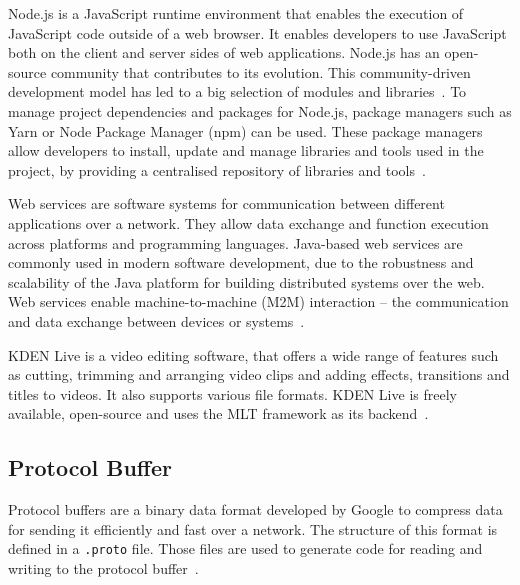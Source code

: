 \documentclass[../MasterThesis.tex]{subfiles}
\begin{document}
Node.js is a JavaScript runtime environment that enables the execution of JavaScript code outside of a web browser.
It enables developers to use JavaScript both on the client and server sides of web applications. 
Node.js has an open-source community that contributes to its evolution. This community-driven development model has led to a big selection of modules and libraries~\cite{nodejs, RM_Frontend, ap3_docs}.
%
To manage project dependencies and packages for Node.js, package managers such as Yarn or Node Package Manager (npm) can be used. These package managers allow developers to install, update and manage libraries and tools used in the project, by providing a centralised repository of libraries and tools~\cite{RM_Frontend, npmyarn}.



Web services are software systems for communication between different applications over a network. 
They allow data exchange and function execution across platforms and programming languages. 
Java-based web services are commonly used in modern software development, due to the robustness and scalability of the Java platform for building distributed systems over the web.
Web services enable machine-to-machine (M2M) interaction -- the communication and data exchange between devices or systems~\cite{webservice}.

KDEN Live is a video editing software, that offers a wide range of features such as cutting, trimming and arranging video clips and adding effects, transitions and titles to videos. It also supports various file formats. KDEN Live is freely available, open-source and uses the MLT framework as its backend~\cite{kdenlive}.











\subsection{Protocol Buffer}
\label{subsection:protocolbuffer}


Protocol buffers are a binary data format developed by Google to compress data for sending it efficiently and fast over a network. The structure of this format is defined in a \texttt{.proto} file. Those files are used to generate code for reading and writing to the protocol buffer~\cite{protobuffer}.
\end{document}
